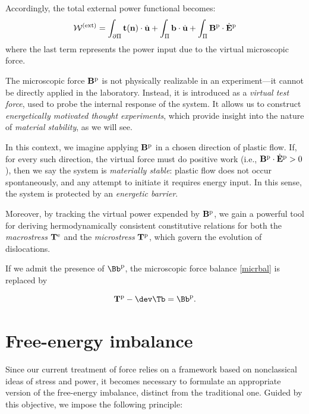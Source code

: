 Accordingly, the total external power functional becomes:
\begin{equation}
	\mathcal{W}^{\rm (ext)} = \int_{\partial \Pi} \mathbf{t}(\mathbf{n}) \cdot \dot{\mathbf{u}} 
	+ \int_{\Pi} \mathbf{b} \cdot \dot{\mathbf{u}} 
	+ \int_\Pi \mathbf{B}^{\rm p} \cdot \dot{\mathbf{E}}^{\rm p}
\end{equation}
where the last term represents the power input due to the virtual microscopic force.


The microscopic force $\mathbf{B}^{\rm p}$ is not physically realizable in an experiment—it cannot be directly applied in the laboratory. Instead, it is introduced as a \emph{virtual test force}, used to probe the internal response of the system. It allows us to construct \emph{energetically motivated thought experiments}, which provide insight into the nature of \emph{material stability}, as we will see.

In this context, we imagine applying $\mathbf{B}^{\rm p}$ in a chosen direction of plastic flow. If, for every such direction, the virtual force must do positive work (i.e., $\mathbf{B}^{\rm p} \cdot \dot{\mathbf{E}}^{\rm p} > 0$), then we say the system is \emph{materially stable}: plastic flow does not occur spontaneously, and any attempt to initiate it requires energy input. In this sense, the system is protected by an \emph{energetic barrier}.

Moreover, by tracking the virtual power expended by $\mathbf{B}^{\rm p}$, we gain a powerful tool for deriving hermodynamically consistent constitutive relations for both the \emph{ macrostress} $\mathbf{T}^{\rm e}$ and the \emph{ microstress} $\mathbf{T}^{\rm p}$, which govern the evolution of dislocations.

If we admit the presence of $\Bb^{\rm p}$, the microscopic force balance \eqref{micrbal} is replaced by
\begin{definition}
\begin{equation}\label{micrbal1}
	 \mathbf{T}^{\rm p}-\dev \Tb=\Bb^{\rm p}. 
\end{equation}
\end{definition}

\section{Free-energy imbalance}

Since our current treatment of force relies on a  framework based on nonclassical ideas of stress and power, it becomes necessary to formulate an appropriate version of the free-energy imbalance, distinct from the traditional one. Guided by this objective, we impose the following principle:

